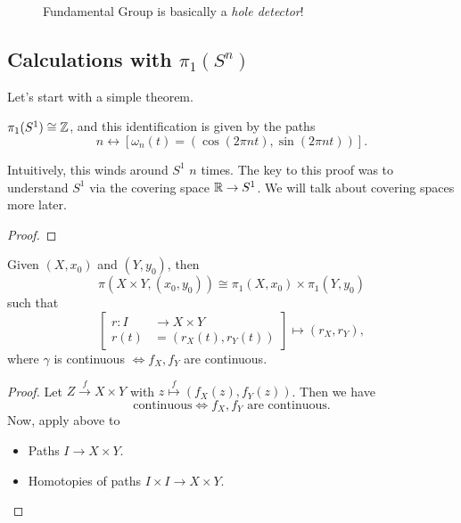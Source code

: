 \begin{figure}[H]
	\centering
	\caption{Fundamental Group is basically a \emph{hole detector}!}
	\label{fig:fundamental-group-hole-detector}
\end{figure}

\subsection{Calculations with \(\pi _1(S^n)\)}
Let's start with a simple theorem.
\begin{theorem}
	\(\pi _1(S^1)\cong \mathbb{\MakeUppercase{z}} \), and this identification is given by the paths
	\[
		n \leftrightarrow [\omega_{n}(t) = (\cos (2\pi nt), \sin (2\pi nt))].
	\]
\end{theorem}
\begin{remark}
	Intuitively, this winds around \(S^1\) \(n\) times. The key to this proof was to understand \(S^1\) via the covering space \(\mathbb{\MakeUppercase{r}} \to S^1\).
	We will talk about covering spaces more later.
\end{remark}
\begin{proof}
\end{proof}

\begin{theorem}
	Given \((X, x_0)\) and \((Y, y_0)\), then
	\[
		\pi (X\times Y, (x_0, y_0)) \cong \pi_1(X, x_0)\times \pi _1(Y, y_0)
	\]
	such that
	\[
		\left[\begin{alignedat}{3}
				r\colon I&\to X\times Y\\
				r(t) &= \left(r_X(t), r_Y(t)\right)
			\end{alignedat}\right] \mapsto (r_{X}, r_{Y}),
	\]
	where \(\gamma\) is continuous \(\iff f_{X}, f_{Y}\) are continuous.
\end{theorem}
\begin{proof}
	Let \(Z\overset{f}{\to} X\times Y\) with \(z\overset{f}{\mapsto} \left(f_{X}(z), f_{Y}(z)\right)\). Then we have
	\[
		\text{continuous}\iff f_{X}, f_{Y}  \text{ are continuous}.
	\]
	Now, apply above to
	\begin{itemize}
		\item Paths \(I\to X\times Y\).
		\item Homotopies of paths \(I\times I\to X\times Y\).
	\end{itemize}
\end{proof}

